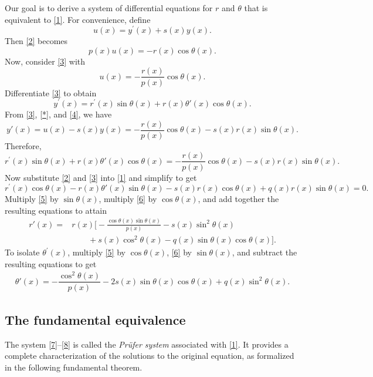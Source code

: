 \documentclass[11pt, reqno]{amsart}
\numberwithin{equation}{section}  %
\theoremstyle{plain}
\theoremstyle{definition}
\theoremstyle{remark}
\begin{document}
Our goal is to derive a system of differential equations for $r$ and $\theta$ that is equivalent to \eqref{1}. For convenience, define 
\begin{equation} \label{*}
u(x)=y^\prime (x)+s(x)y(x).
\end{equation}
Then \eqref{2} becomes 
\begin{equation} \label{**}
p(x)u(x)=-r(x)\cos  \theta (x) .
\end{equation}
Now, consider \eqref{3} with 
\begin{equation} \label{4}
u(x)=-\dfrac{r(x)}{p(x)}\cos\theta(x).
\end{equation}
Differentiate \eqref{3} to obtain
\[y^\prime (x)=r^\prime (x) \sin\theta(x) +r(x)\theta'(x) \cos\theta(x).\]
From \eqref{3}, \eqref{*}, and \eqref{4}, we have 
\[y'(x) = u(x)-s(x)y(x) = -\dfrac{r(x)}{p(x)}\cos \theta (x)-s(x)r(x)\sin \theta(x).\]
Therefore, 
\begin{equation} \label{5}
r^\prime (x) \sin\theta(x)+r(x)\theta'(x) \cos\theta(x)=-\dfrac{r(x)}{p(x)}\cos\theta(x)-s(x)r(x)\sin\theta(x).
\end{equation}
Now substitute \eqref{2} and \eqref{3} into \eqref{1} and simplify to get
\begin{equation} \label{6}
r^\prime (x) \cos\theta(x)-r(x)\theta'(x)\sin\theta(x)-s(x)r(x)\cos\theta(x)+q(x)r(x)\sin\theta(x)=0.
\end{equation}
Multiply \eqref{5} by $\sin\theta(x)$, multiply \eqref{6} by $\cos\theta(x)$, and add together the resulting equations to attain
\begin{align} \label{7}
r'(x) ={}&
r(x)\Bigg[
-\frac{\cos\theta(x)\sin\theta(x)}{p(x)}
- s(x)\sin^2\theta(x) \nonumber\\
&\qquad
+ s(x)\cos^2\theta(x)
- q(x)\sin\theta(x)\cos\theta(x)
\Bigg].
\end{align}
To isolate $\theta^\prime(x)$, multiply \eqref{5} by $\cos\theta(x)$, \eqref{6} by $\sin\theta(x)$, and subtract the resulting equations to get 
\begin{align} \label{8}
\theta'(x)=-\dfrac{\cos^2\theta(x)}{p(x)} - 2s(x)\sin\theta(x)\cos\theta(x)+q(x)\sin^2\theta(x).
\end{align}

\subsection{The fundamental equivalence}
The system \eqref{7}--\eqref{8} is called the \textit{Pr\"ufer system} associated with \eqref{1}. It provides a complete characterization of the solutions to the original equation, as formalized in the following fundamental theorem.
\end{document}
